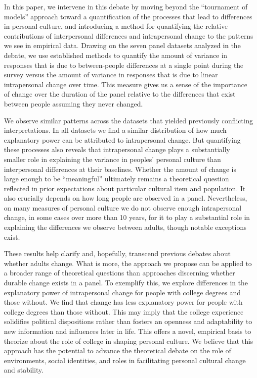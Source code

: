\documentclass[
  12pt,
]{article}
\begin{document}
In this paper, we intervene in this debate by moving beyond the
``tournament of models'' approach toward a quantification of the
processes that lead to differences in personal culture, and introducing
a method for quantifying the relative contributions of interpersonal
differences and intrapersonal change to the patterns we see in empirical
data. Drawing on the seven panel datasets analyzed in the debate, we use
established methods to quantify the amount of variance in responses that
is due to between-people differences at a single point during the survey
versus the amount of variance in responses that is due to linear
intrapersonal change over time. This measure gives us a sense of the
importance of change over the duration of the panel relative to the
differences that exist between people assuming they never changed.

We observe similar patterns across the datasets that yielded previously
conflicting interpretations. In all datasets we find a similar
distribution of how much explanatory power can be attributed to
intrapersonal change. But quantifying these processes also reveals that
intrapersonal change plays a substantially smaller role in explaining
the variance in peoples' personal culture than interpersonal differences
at their baselines. Whether the amount of change is large enough to be
``meaningful'' ultimately remains a theoretical question reflected in
prior expectations about particular cultural item and population. It
also crucially depends on how long people are observed in a panel.
Nevertheless, on many measures of personal culture we do not observe
enough intrapersonal change, in some cases over more than 10 years, for
it to play a substantial role in explaining the differences we observe
between adults, though notable exceptions exist.

These results help clarify and, hopefully, transcend previous debates
about whether adults change. What is more, the approach we propose can
be applied to a broader range of theoretical questions than approaches
discerning whether durable change exists in a panel. To exemplify this,
we explore differences in the explanatory power of intrapersonal change
for people with college degrees and those without. We find that change
has less explanatory power for people with college degrees than those
without. This may imply that the college experience solidifies political
dispositions rather than fosters an openness and adaptability to new
information and influences later in life. This offers a novel, empirical
basis to theorize about the role of college in shaping personal culture.
We believe that this approach has the potential to advance the
theoretical debate on the role of environments, social identities, and
roles in facilitating personal cultural change and stability.
\end{document}
